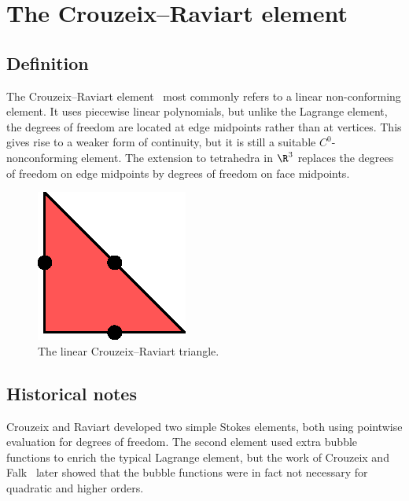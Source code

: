 
\newpage

\section{The Crouzeix--Raviart element}

\subsection{Definition}

The Crouzeix--Raviart element~\cite{CrouzeixRaviart1973} most commonly
refers to a linear non-confor\-ming element. It uses piecewise linear
polynomials, but unlike the Lagrange element, the degrees of freedom
are located at edge midpoints rather than at vertices.  This gives
rise to a weaker form of continuity, but it is still a suitable
$C^0$-nonconforming element. The extension to tetrahedra in $\R^3$
replaces the degrees of freedom on edge midpoints by degrees of
freedom on face midpoints.


\begin{figure}[H]
  \begin{center} \includegraphics[width=\smallwidth]{chapters/kirby-6/eps/CR1.eps}
    \caption{The linear Crouzeix--Raviart triangle.}  \end{center}
\end{figure}

\subsection{Historical notes}

Crouzeix and Raviart developed two simple Stokes elements, both using
pointwise evaluation for degrees of freedom. The second element used
extra bubble functions to enrich the typical Lagrange element, but the
work of Crouzeix and Falk~\cite{CrouzeixFalk1989} later showed that
the bubble functions were in fact not necessary for quadratic and
higher orders.

